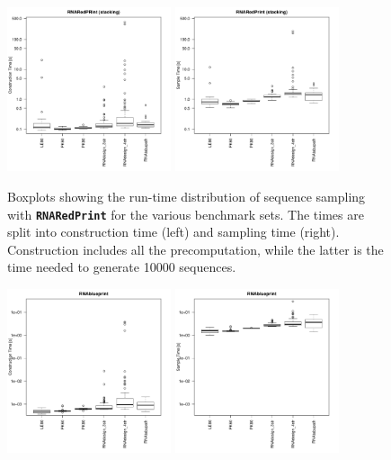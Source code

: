 \documentclass[10pt]{article}
\newcommand{\ourprog}{{\tt \bfseries{}\color{black!85}RNA\textcolor{red!70!black}{Red}Print}}
\newenvironment{revision}{\color{red}}{\color{black}}
\begin{document}
\begin{revision}
\begin{figure}[h!]
  \centering
  \includegraphics[width=0.43\textwidth]{Figs/RunTimes/construction_time_sets}\quad%
  \includegraphics[width=0.43\textwidth]{Figs/RunTimes/sample_time_sets}
  \caption{Boxplots showing the run-time distribution of sequence sampling with \ourprog{} for the various benchmark sets. The times are split into construction time (left) and sampling time (right). Construction includes all the precomputation, while the latter is the time needed to generate 10000 sequences. }
  \label{appfig:run-times-redprint}
\end{figure}
\begin{figure}[h!]
  \centering
  \includegraphics[width=0.43\textwidth]{Figs/RunTimes/construction_time_sets_rbp}\quad%
  \includegraphics[width=0.43\textwidth]{Figs/RunTimes/sample_time_sets_rbp}

\end{figure}
\end{revision}
\end{document}
